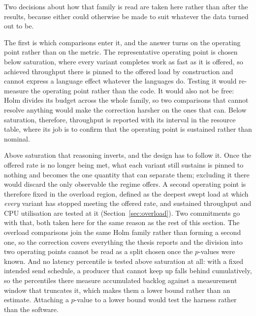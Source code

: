 \documentclass[english,twoside,openright,a4paper,censored,csm,software-track-2020]{HYthesisML}
\begin{document}
Two decisions about how that family is read are taken here rather than after the results,
because either could otherwise be made to suit whatever the data turned out to be.

The first is which comparisons enter it, and the answer turns on the operating point rather than
on the metric. The representative operating point is chosen below saturation, where every variant
completes work as fast as it is offered, so achieved throughput there is pinned to the offered
load by construction and cannot express a language effect whatever the languages do. Testing it
would re-measure the operating point rather than the code. It would also not be free: Holm
divides its budget across the whole family, so two comparisons that cannot resolve anything would
make the correction harsher on the ones that can. Below saturation, therefore, throughput is
reported with its interval in the resource table, where its job is to confirm that the operating
point is sustained rather than nominal.

Above saturation that reasoning inverts, and the design has to follow it. Once the offered rate
is no longer being met, what each variant still sustains is pinned to nothing and becomes the one
quantity that can separate them; excluding it there would discard the only observable the regime
offers. A second operating point is therefore fixed in the overload region, defined as the
deepest swept load at which \emph{every} variant has stopped meeting the offered rate, and
sustained throughput and CPU utilisation are tested at it (Section~\ref{sec:overload}). Two
commitments go with that, both taken here for the same reason as the rest of this section. The
overload comparisons join the same Holm family rather than forming a second one, so the
correction covers everything the thesis reports and the division into two operating points
cannot be read as a split chosen once the $p$-values were known. And no latency percentile is
tested above saturation at all: with a fixed intended send schedule, a producer that cannot keep
up falls behind cumulatively, so the percentiles there measure accumulated backlog against a
measurement window that truncates it, which makes them a lower bound rather than an estimate.
Attaching a $p$-value to a lower bound would test the harness rather than the software.
\end{document}
